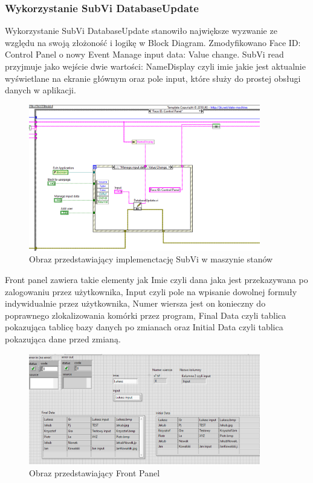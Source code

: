 \documentclass{report}
\begin{document}
\subsubsection{\large Wykorzystanie SubVi DatabaseUpdate}

Wykorzystanie SubVi DatabaseUpdate stanowiło największe wyzwanie ze względu na swoją złożoność i logikę w Block Diagram. Zmodyfikowano Face ID: Control Panel o nowy Event
Manage input data: Value change. SubVi read przyjmuje jako wejście dwie wartości: NameDisplay czyli imie jakie jest aktualnie wyświetlane na ekranie głównym oraz pole input, które 
służy do prostej obsługi danych w aplikacji.

\begin{figure}[H]
    \centering
    \includegraphics[width=0.9\textwidth]{src/Database/Database_update.png}
    \caption{Obraz przedstawiający implemenctację SubVi w maszynie stanów}
    \label{fig:first-att}
\end{figure}

Front panel zawiera takie elementy jak Imie czyli dana jaka jest przekazywana po zalogowaniu przez użytkownika, Input czyli pole na wpisanie dowolnej formuły indywidualnie przez użytkownika,
Numer wiersza jest on konieczny do poprawnego zlokalizowania komórki przez program, Final Data czyli tablica pokazująca tablicę bazy danych po zmianach oraz Initial Data czyli tablica pokazująca
dane przed zmianą.

\begin{figure}[H]
    \centering
    \includegraphics[width=0.9\textwidth]{src/Database/Database_update_subvi_frontpanel.png}
    \caption{Obraz przedstawiający Front Panel}
    \label{fig:first-att}
\end{figure}
\end{document}
